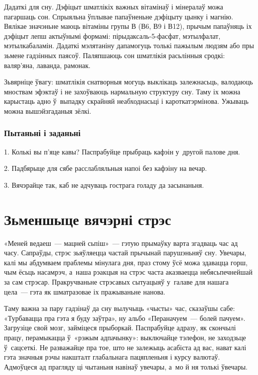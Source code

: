 Дадаткі для сну. Дэфіцыт шматлікіх важных вітамінаў і мінералаў можа пагаршаць сон. Спрыяльна ўплывае папаўненьне дэфіцыту цынку і магнію. Вялікае значэньне маюць вітаміны групы В (В6, В9 і В12), прычым папаўняць іх дэфіцыт лепш актыўнымі формамі: пірыдаксаль-5-фасфат, мэтылфалат, мэтылкабаламін. Дадаткі мэлятаніну дапамогуць толькі пажылым людзям або пры зьмене гадзінных паясоў. Паляпшаюць сон шматлікія расьлінныя сродкі: валяр'яна, лаванда, рамонак.

Зьвярніце ўвагу: шматлікія снатворныя могуць выклікаць залежнасьць, валодаюць мноствам эфэктаў і не захоўваюць нармальную структуру сну. Таму іх можна карыстаць адно ў~выпадку скрайняй неабходнасьці і кароткатэрмінова. Ужываць можна вышэйзгаданыя зёлкі.

\subsubsection{Пытаньні і заданьні}

1. Колькі вы п'яце кавы? Паспрабуйце прыбраць кафэін у~другой палове дня.

2. Падбярыце для сябе расслабляльныя напоі без кафэіну на вечар.

3. Вячэрайце так, каб не адчуваць гострага голаду да засынаньня.


\section{Зьменшыце вячэрні стрэс}

«Меней ведаеш~--- мацней сьпіш»~--- гэтую прымаўку варта згадваць час ад часу. Сапраўды, стрэс зьяўляецца частай прычынай парушэньняў сну. Увечары, калі мы абдумваем праблемы мінулага дня, праз стому ўсё можа здавацца горш, чым ёсьць насамрэч, а~наша рэакцыя на стрэс часта аказваецца небясьпечнейшай за сам стрэсар. Пракручваньне стрэсавых сытуацыяў у~галаве для нашага цела~--- гэта як шматразовае іх пражываньне нанова.

Таму важна за пару гадзінаў да сну вылучыць «чысты» час, сказаўшы сабе: «Турбавацца пра гэта я буду заўтра», ну альбо «Пераначуем~--- болей пачуем». Загрузіце свой мозг, займіцеся прыборкай. Паспрабуйце адразу, як скончылі працу, перамыкацца ў~«рэжым адпачынку»: выключайце тэлефон, не заходзьце ў~сацсеткі. Не разважайце пра тое, што не залежыць асабіста ад вас, нават калі гэта значныя рэчы накшталт глабальнага пацяпленьня і курсу валютаў. Адмоўцеся ад прагляду ці чытаньня навінаў увечары, а~мо й ня толькі ўвечары.

